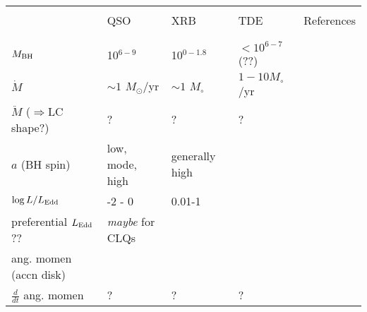 \documentclass[11pt]{article}
\begin{document}
\clearpage
\LARGE
\begin{table}
    \begin{center}
       \begin{tabular}{l lll c } 

        \hline
        \hline 
                                               &                                         &                                        &                        &                   \\
                                               & QSO                                 & XRB                                  & TDE                &  References \\
                                               &                                         &                                        &                        &                    \\
         \hline 
                                               &                                         &                                         &                                &   \\
$M_{\rm BH}$                            & 10$^{6-9}$                        & 10$^{0-1.8}$                      &  $<10^{6-7}$(??)        &   \\ 
$\dot{M}$                               &  $\sim1$ $M_{\odot}$/yr   & $\sim1$ $M_{\circ}$         & $1-10 M_{\circ}$/yr  &   \\
$\ddot{M}$ ($\Rightarrow$LC shape?)   &  ?                      &  ?                                     & ?                              &  \\
$a$ (BH spin)                          & low, mode, high              & generally high                  &                                & \\
$\log L/ L_{\rm Edd}$                & -2 - 0                             & 0.01-1                              &                                & \\
preferential $L_{\rm Edd}$??       & {\it maybe} for CLQs       &                                         &                                & \\
ang. momen (accn disk)         &                                         &                                         &                               & \\           
$\frac{d}{dt}$ ang. momen     &    ?                                    &      ?                                  & ?                            &  \\           

\end{tabular}
\end{center}
\end{table}
\end{document}
